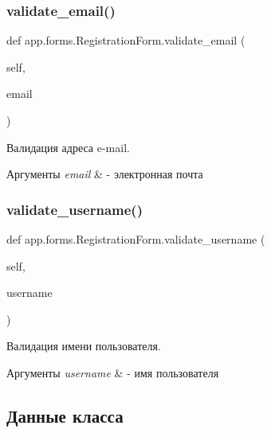 \subsubsection{\texorpdfstring{validate\+\_\+email()}{validate\_email()}}
{\footnotesize\ttfamily def app.\+forms.\+Registration\+Form.\+validate\+\_\+email (\begin{DoxyParamCaption}\item[{}]{self,  }\item[{}]{email }\end{DoxyParamCaption})}



Валидация адреса e-\/mail. 


\begin{DoxyParams}{Аргументы}
{\em email} & -\/ электронная почта \\
\hline
\end{DoxyParams}
\mbox{\label{classapp_1_1forms_1_1_registration_form_a69ecc2875e684131ba0eeb9451e9c47c}} 
\subsubsection{\texorpdfstring{validate\+\_\+username()}{validate\_username()}}
{\footnotesize\ttfamily def app.\+forms.\+Registration\+Form.\+validate\+\_\+username (\begin{DoxyParamCaption}\item[{}]{self,  }\item[{}]{username }\end{DoxyParamCaption})}



Валидация имени пользователя. 


\begin{DoxyParams}{Аргументы}
{\em username} & -\/ имя пользователя \\
\hline
\end{DoxyParams}


\subsection{Данные класса}
\mbox{\label{classapp_1_1forms_1_1_registration_form_af98d363c036c4b9afcf8ac4bc2d3ee6a}} 
